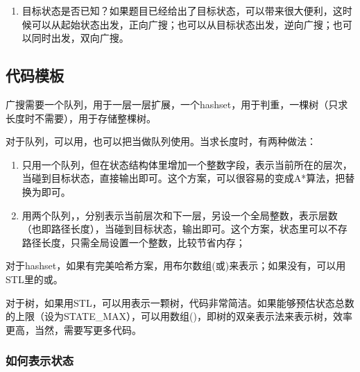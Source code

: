 \begin{enumerate}
\item 目标状态是否已知？如果题目已经给出了目标状态，可以带来很大便利，这时候可以从起始状态出发，正向广搜；也可以从目标状态出发，逆向广搜；也可以同时出发，双向广搜。
\end{enumerate}


\subsection{代码模板}
广搜需要一个队列，用于一层一层扩展，一个hashset，用于判重，一棵树（只求长度时不需要），用于存储整棵树。

对于队列，可以用，也可以把当做队列使用。当求长度时，有两种做法：
\begin{enumerate}
\item 只用一个队列，但在状态结构体里增加一个整数字段，表示当前所在的层次，当碰到目标状态，直接输出即可。这个方案，可以很容易的变成A*算法，把替换为即可。
\item 用两个队列，，分别表示当前层次和下一层，另设一个全局整数，表示层数（也即路径长度），当碰到目标状态，输出即可。这个方案，状态里可以不存路径长度，只需全局设置一个整数，比较节省内存；
\end{enumerate}

对于hashset，如果有完美哈希方案，用布尔数组(或)来表示；如果没有，可以用STL里的或。

对于树，如果用STL，可以用表示一颗树，代码非常简洁。如果能够预估状态总数的上限（设为STATE_MAX），可以用数组()，即树的双亲表示法来表示树，效率更高，当然，需要写更多代码。


\subsubsection{如何表示状态}

